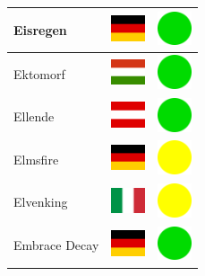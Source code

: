 \documentclass[12pt, a4paper, twoside]{report}
\begin{document}
\begin{center}
\begin{longtable}{|p{5cm}|p{2cm}|p{2cm}|}
 Eisregen                                                   & \includegraphics[width=1cm]{../4x3/de} &   \includegraphics[width=1cm]{../likes/y} \\ \hline
 Ektomorf                                                   & \includegraphics[width=1cm]{../4x3/hu} &   \includegraphics[width=1cm]{../likes/y} \\ \hline
 Ellende                                                    & \includegraphics[width=1cm]{../4x3/at} &   \includegraphics[width=1cm]{../likes/y} \\ \hline
 Elmsfire                                                   & \includegraphics[width=1cm]{../4x3/de} &   \includegraphics[width=1cm]{../likes/m} \\ \hline
 Elvenking                                                  & \includegraphics[width=1cm]{../4x3/it} &   \includegraphics[width=1cm]{../likes/m} \\ \hline
 Embrace Decay                                              & \includegraphics[width=1cm]{../4x3/de} &   \includegraphics[width=1cm]{../likes/y} \\ \hline

\end{longtable}
\end{center}
\end{document}
